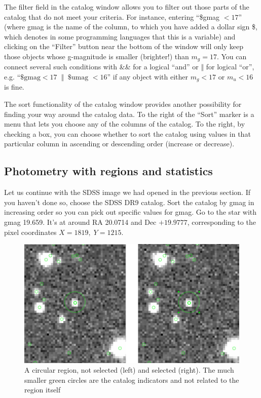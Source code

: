 \documentclass[twocolumn,apj]{openjournal}
\begin{document}
The filter field in the catalog window allows you to filter out those parts of the catalog that do not meet your criteria. For instance, entering ``\$gmag $< 17$'' (where gmag is the name of the column, to which you have added a dollar sign \$, which denotes in some programming languages that this is a variable) and clicking on the ``Filter'' button near the bottom of the window will only keep those objects whose g-magnitude is smaller (brighter!) than $m_g=17$. You can connect several such conditions with \&\& for a logical ``and'' or $\Vert$ for logical ``or'', e.g. 
``$\mbox{\$gmag} < 17\;\; \Vert \;\; \mbox{\$umag }< 16$'' if any object with either $m_g<17$ or $m_u<16$ is fine.

The sort functionality of the catalog window provides another possibility for finding your way around the catalog data. To the right of the ``Sort'' marker is a menu that lets you choose any of the columns of the catalog. To the right, by checking a box, you can choose whether to sort the catalog using values in that particular column in ascending or descending order (increase or decrease).

\subsection{Photometry with regions and statistics}
\label{DS9Photometry}

Let us continue with the SDSS image we had opened in the previous section. If you haven't done so, choose the SDSS DR9 catalog. Sort the catalog by gmag in increasing order so you can pick out specific values for gmag. Go to the star with gmag 19.659. It's at around RA 20.0714 and Dec $+19.9777$, corresponding to the pixel coordinates $X=1819,\; Y=1215$.

\begin{figure}[htbp]
\begin{center}
\includegraphics[width=\linewidth]{selected.jpg}
\caption{A circular region, not selected (left) and selected (right). The much smaller green circles are the catalog indicators and not related to the region itself}
\label{DS9Selected}
\end{center}
\end{figure}
\end{document}

